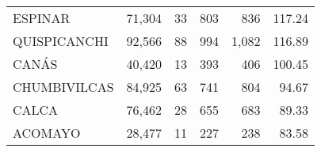 \begin{tabular}{lrrrrr}
	\cellcolor[HTML]{9AFF99}ESPINAR                                                    & 71,304                                                         & 33                                                       & 803                                                      & 836                                                                 & 117.24                                                                       \\
	\cellcolor[HTML]{9AFF99}QUISPICANCHI                                               & 92,566                                                         & 88                                                       & 994                                                      & 1,082                                                               & 116.89                                                                       \\
	\cellcolor[HTML]{9AFF99}CANÁS                                                      & 40,420                                                         & 13                                                       & 393                                                      & 406                                                                 & 100.45                                                                       \\
	\cellcolor[HTML]{9AFF99}CHUMBIVILCAS                                               & 84,925                                                         & 63                                                       & 741                                                      & 804                                                                 & 94.67                                                                        \\
	\cellcolor[HTML]{9AFF99}CALCA                                                      & 76,462                                                         & 28                                                       & 655                                                      & 683                                                                 & 89.33                                                                        \\
	\cellcolor[HTML]{9AFF99}ACOMAYO                                                    & 28,477                                                         & 11                                                       & 227                                                      & 238                                                                 & 83.58                                                                        \\

\end{tabular}
